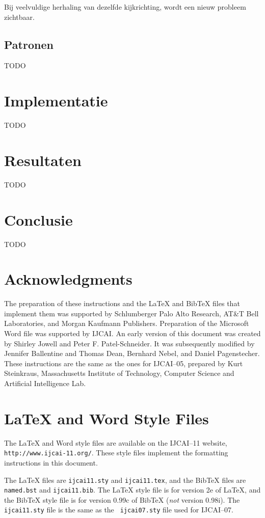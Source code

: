 \documentclass{article}
\begin{document}
Bij veelvuldige herhaling van dezelfde kijkrichting, wordt een nieuw probleem zichtbaar.

\subsection{Patronen}
TODO

\section{Implementatie}
TODO

\section{Resultaten}
TODO

\section{Conclusie}
TODO

\section*{Acknowledgments}

The preparation of these instructions and the \LaTeX{} and Bib\TeX{}
files that implement them was supported by Schlumberger Palo Alto
Research, AT\&T Bell Laboratories, and Morgan Kaufmann Publishers.
Preparation of the Microsoft Word file was supported by IJCAI.  An
early version of this document was created by Shirley Jowell and Peter
F. Patel-Schneider.  It was subsequently modified by Jennifer
Ballentine and Thomas Dean, Bernhard Nebel, and Daniel Pagenstecher.
These instructions are the same as the ones for IJCAI--05, prepared by
Kurt Steinkraus, Massachusetts Institute of Technology, Computer
Science and Artificial Intelligence Lab.

\appendix

\section{\LaTeX{} and Word Style Files}\label{stylefiles}

The \LaTeX{} and Word style files are available on the IJCAI--11
website, {\tt http://www.ijcai-11.org/}.
These style files implement the formatting instructions in this
document.

The \LaTeX{} files are {\tt ijcai11.sty} and {\tt ijcai11.tex}, and
the Bib\TeX{} files are {\tt named.bst} and {\tt ijcai11.bib}. The
\LaTeX{} style file is for version 2e of \LaTeX{}, and the Bib\TeX{}
style file is for version 0.99c of Bib\TeX{} ({\em not} version
0.98i). The {\tt ijcai11.sty} file is the same as the {\tt
ijcai07.sty} file used for IJCAI--07.
\end{document}
